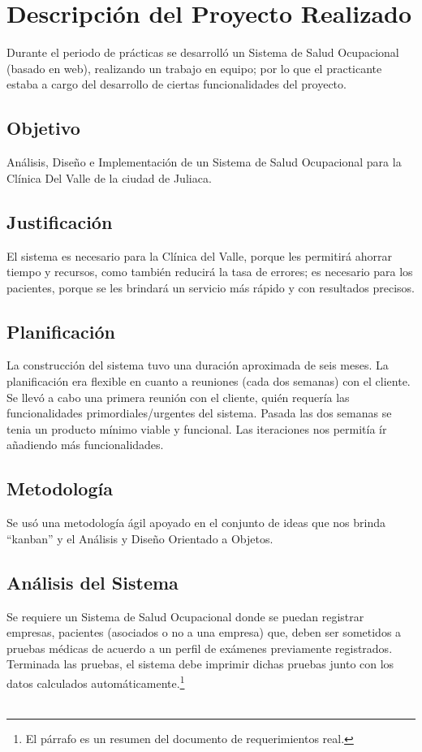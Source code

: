 \chapter{Descripción del Proyecto Realizado}
	Durante el periodo de prácticas se desarrolló un Sistema de Salud Ocupacional
	(basado en web), realizando un trabajo en equipo; por lo que el practicante
	estaba a cargo del desarrollo de ciertas funcionalidades del proyecto.
	
	\section{Objetivo}
		Análisis, Diseño e Implementación de un Sistema de Salud Ocupacional para la
		Clínica Del Valle de la ciudad de Juliaca.
		
	\section{Justificación}
		El sistema es necesario para la Clínica del Valle, porque les permitirá
		ahorrar tiempo y recursos, como también reducirá la tasa de errores; es necesario para
		los pacientes, porque se les brindará un servicio más rápido y con resultados
		precisos.
		
	\section{Planificación}
		La construcción del sistema tuvo una duración aproximada de seis meses. La
		planificación era flexible en cuanto a reuniones (cada dos semanas) con el
		cliente. Se llevó a cabo una primera reunión con el cliente, quién
		requería las funcionalidades primordiales/urgentes del sistema. Pasada las dos
		semanas se tenia un producto mínimo viable y funcional. Las iteraciones nos
		permitía ír añadiendo más funcionalidades.
		
	\section{Metodología}
		Se usó una metodología ágil apoyado en el conjunto de ideas que nos brinda
		``kanban'' y el Análisis y Diseño Orientado a Objetos.
		
	\section{Análisis del Sistema}
		Se requiere un Sistema de Salud Ocupacional donde se puedan registrar
		empresas, pacientes (asociados o no a una empresa) que, deben ser sometidos a
		pruebas médicas de acuerdo a un perfil de exámenes previamente registrados.
		Terminada las pruebas, el sistema debe imprimir dichas pruebas junto con los
		datos calculados automáticamente.\footnote{El párrafo es un resumen del
		documento de requerimientos real.} \\\
	
